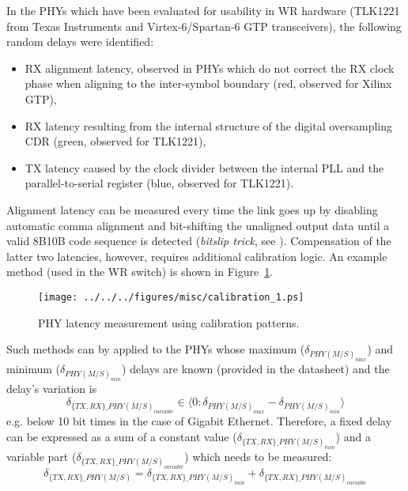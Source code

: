 In the PHYs which have been evaluated for usability in WR hardware (TLK1221
from Texas Instruments and Virtex-6/Spartan-6 GTP transceivers), the following
random delays were identified:
\begin{itemize}
\item RX alignment latency, observed in PHYs which do not correct the RX
clock phase when aligning to the inter-symbol boundary (red, observed for
Xilinx GTP),
\item RX latency resulting from the internal structure of the digital
oversampling CDR (green, observed for TLK1221),
\item TX latency caused by the clock divider between the internal PLL and
the parallel-to-serial register (blue, observed for TLK1221).
\end{itemize}
Alignment latency can be measured every time the link goes up by disabling
automatic comma alignment and bit-shifting the unaligned output data
until a valid 8B10B code sequence is detected (\textit{bitslip trick},
see \cite{Peek2010}). Compensation of the latter two latencies, however,
requires additional calibration logic. An example method (used in the WR
switch) is shown in Figure~\ref{fig:phy_latency_measurement}.
\begin{figure}[ht!]
  \centering
  \texttt{[image: ../../../figures/misc/calibration\_1.ps]}
  \caption{PHY latency measurement using calibration patterns.}
  \label{fig:phy_latency_measurement}
\end{figure}
Such methods can by applied to the
PHYs whose maximum ($\delta_{PHY(M/S)_{max}}$) and minimum ($\delta_{PHY(M/S)_{min}}$) delays are known 
(provided in the datasheet) and the delay's variation is
\begin{equation}
  \label{eq:fixedDelayVariation}
  \delta_{\{TX, RX\}\_PHY(M/S)_{variable}} \in \langle 0 :\delta_{PHY(M/S)_{max}} - \delta_{PHY(M/S)_{min}} \rangle
\end{equation}
e.g. below 10 bit times in the case of Gigabit Ethernet. 
Therefore, a fixed delay can be expressed as a sum of a constant value 
($\delta_{\{TX, RX\}\_PHY(M/S)_{min}}$) and a variable part ($\delta_{\{TX, RX\}\_PHY(M/S)_{variable}}$) which needs to be measured:
\begin{equation}
  \label{eq:fixedDelay}
  \delta_{\{TX, RX\}\_PHY(M/S)} = \delta_{\{TX, RX\}\_PHY(M/S)_{min}} + \delta_{\{TX, RX\}\_PHY(M/S)_{variable}}
\end{equation}
 


